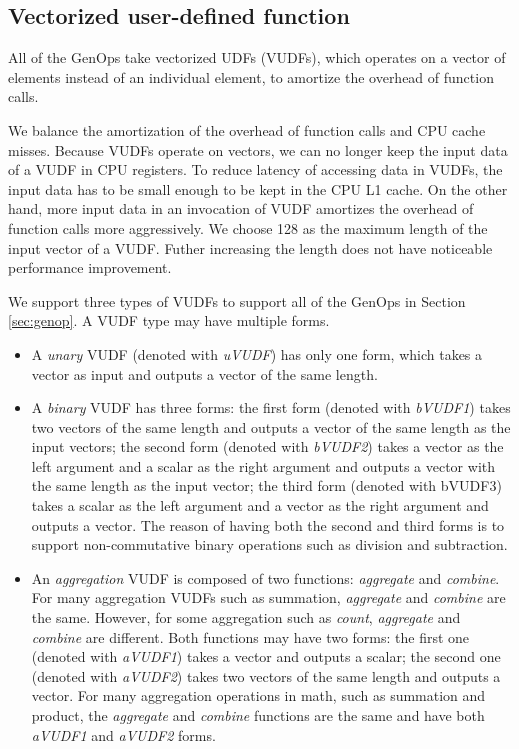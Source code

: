 \subsection{Vectorized user-defined function}
All of the GenOps take vectorized UDFs (VUDFs), which operates on a vector
of elements instead of an individual element, to amortize the overhead
of function calls.

We balance the amortization of the overhead of function calls and CPU cache
misses. Because VUDFs operate on vectors, we can no longer keep the input data
of a VUDF in CPU registers. To reduce latency of accessing data in VUDFs,
the input data has to be small enough to be kept in the CPU L1 cache. On the
other hand, more input data in an invocation of VUDF amortizes the overhead of
function calls more aggressively. We choose 128 as the maximum length of
the input vector of a VUDF.
Futher increasing the length does not have noticeable performance improvement.

We support three types of VUDFs to support all of the GenOps in Section
\ref{sec:genop}. A VUDF type may have multiple forms.
\begin{itemize}
	\item A \textit{unary} VUDF (denoted with \textit{uVUDF}) has only one form,
		which takes a vector as input and outputs a vector of the same length.
	\item A \textit{binary} VUDF has three forms: the first form (denoted with
		\textit{bVUDF1}) takes two vectors of the same length and outputs
		a vector of the same length as the input vectors; the second form (denoted
		with \textit{bVUDF2}) takes a vector as the left argument and a scalar
		as the right argument and outputs a vector with the same length as
		the input vector; the third form (denoted with bVUDF3) takes a scalar
		as the left argument and a vector as the right
		argument and outputs a vector. The reason of having both the second and third
		forms is to support non-commutative binary operations such as division and
		subtraction.
	\item An \textit{aggregation} VUDF is composed of two functions:
		\textit{aggregate} and \textit{combine}. For many aggregation VUDFs
		such as summation, \textit{aggregate} and \textit{combine} are the same.
		However, for some aggregation such as \textit{count}, \textit{aggregate}
		and \textit{combine} are different. Both functions may have two forms:
		the first one (denoted with \textit{aVUDF1}) takes a vector and outputs
		a scalar; the second one (denoted with \textit{aVUDF2}) takes two
		vectors of the same length and outputs a vector. For many aggregation
		operations in math, such as summation and product, the \textit{aggregate}
		and \textit{combine} functions are the same and have both \textit{aVUDF1}
		and \textit{aVUDF2} forms.
\end{itemize}

